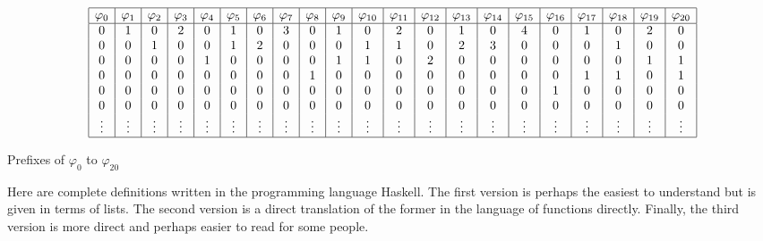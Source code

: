 \documentclass[envcountsame]{llncs}
\begin{document}
\noindent
\begin{table}\label{tab:phi}
\[\begin{array}{|c|c|c|c|c|c|c|c|c|c|c|c|c|c|c|c|c|c|c|c|c|}
\hline
\varphi_{0} & \varphi_{1} & \varphi_{2} & \varphi_{3} & \varphi_{4} & \varphi_{5} & \varphi_{6} & \varphi_{7} & \varphi_{8} & \varphi_{9} & \varphi_{10} & \varphi_{11} & \varphi_{12} & \varphi_{13} & \varphi_{14} & \varphi_{15} & \varphi_{16} & \varphi_{17} & \varphi_{18} & \varphi_{19} & \varphi_{20}\\
\hline
0 & 1 & 0 & 2 & 0 & 1 & 0 & 3 & 0 & 1 & 0 & 2 & 0 & 1 & 0 & 4 & 0 & 1 & 0 & 2 & 0\\
0 & 0 & 1 & 0 & 0 & 1 & 2 & 0 & 0 & 0 & 1 & 1 & 0 & 2 & 3 & 0 & 0 & 0 & 1 & 0 & 0\\
0 & 0 & 0 & 0 & 1 & 0 & 0 & 0 & 0 & 1 & 1 & 0 & 2 & 0 & 0 & 0 & 0 & 0 & 0 & 1 & 1\\
0 & 0 & 0 & 0 & 0 & 0 & 0 & 0 & 1 & 0 & 0 & 0 & 0 & 0 & 0 & 0 & 0 & 1 & 1 & 0 & 1\\
0 & 0 & 0 & 0 & 0 & 0 & 0 & 0 & 0 & 0 & 0 & 0 & 0 & 0 & 0 & 0 & 1 & 0 & 0 & 0 & 0\\
0 & 0 & 0 & 0 & 0 & 0 & 0 & 0 & 0 & 0 & 0 & 0 & 0 & 0 & 0 & 0 & 0 & 0 & 0 & 0 & 0\\
\vdots & \vdots & \vdots & \vdots & \vdots & \vdots & \vdots & \vdots & \vdots & \vdots & \vdots & \vdots & \vdots & \vdots & \vdots & \vdots & \vdots & \vdots & \vdots & \vdots & \vdots\\
\hline
\end{array}\]
\caption{Prefixes of $\varphi_0$ to $\varphi_{20}$}
\end{table}

Here are complete definitions written in the programming language Haskell. The first version is perhaps the easiest to understand but is given in terms of lists. The second version is a direct translation of the former in the language of functions directly. Finally, the third version is more direct and perhaps easier to read for some people.



\end{document}

